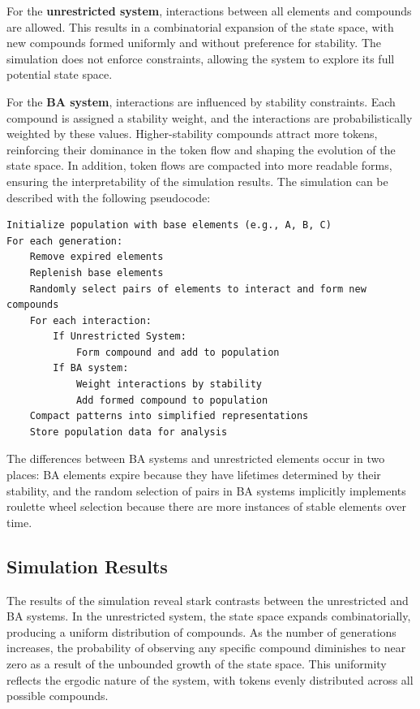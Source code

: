 \documentclass[entropy,article,submit,pdftex,oneauthor]{Definitions/mdpi}
\begin{document}
For the \textbf{unrestricted system}, interactions between all elements and compounds are allowed. This results in a combinatorial expansion of the state space, with new compounds formed uniformly and without preference for stability. The simulation does not enforce constraints, allowing the system to explore its full potential state space.

For the \textbf{BA system}, interactions are influenced by stability constraints. Each compound is assigned a stability weight, and the interactions are probabilistically weighted by these values. Higher-stability compounds attract more tokens, reinforcing their dominance in the token flow and shaping the evolution of the state space. In addition, token flows are compacted into more readable forms, ensuring the interpretability of the simulation results. The simulation can be described with the following pseudocode:

\scriptsize
\begin{center}
\begin{minipage}{0.7\textwidth}
\ttfamily
\begin{verbatim}
Initialize population with base elements (e.g., A, B, C)
For each generation:
    Remove expired elements
    Replenish base elements
    Randomly select pairs of elements to interact and form new compounds
    For each interaction:
        If Unrestricted System:
            Form compound and add to population
        If BA system:
            Weight interactions by stability
            Add formed compound to population
    Compact patterns into simplified representations
    Store population data for analysis
\end{verbatim}
\end{minipage}
\end{center}
\normalsize

The differences between BA systems and unrestricted elements occur in two places: BA elements expire because they have lifetimes determined by their stability, and the random selection of pairs in BA systems implicitly implements roulette wheel selection \cite{goldberg1989genetic} \cite{holland1975adaptation} because there are more instances of stable elements over time. 

\subsection{Simulation Results}

The results of the simulation reveal stark contrasts between the unrestricted and BA systems. In the unrestricted system, the state space expands combinatorially, producing a uniform distribution of compounds. As the number of generations increases, the probability of observing any specific compound diminishes to near zero as a result of the unbounded growth of the state space. This uniformity reflects the ergodic nature of the system, with tokens evenly distributed across all possible compounds.
\end{document}
